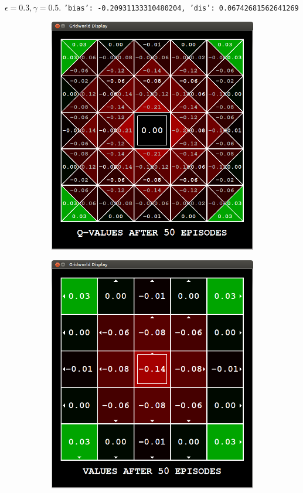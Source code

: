 \documentclass[11pt]{article}
\begin{document}
$\epsilon = 0.3, \gamma = 0.5$.
\texttt{{'bias': -0.20931133310480204, 'dis': 0.06742681562641269}}

\begin{figure}[h!]
\centering
\begin{subfigure}{0.49\textwidth}
	\includegraphics[width=\textwidth]{figure/obstacle}
\end{subfigure}
\begin{subfigure}{0.49\textwidth}
	\includegraphics[width=\textwidth]{figure/obstacle_policy}

\end{subfigure}
\end{figure}
\end{document}
